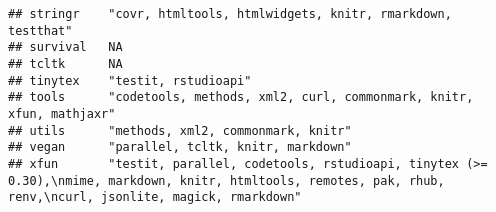 \documentclass[
]{article}
\begin{document}
\begin{verbatim}
## stringr    "covr, htmltools, htmlwidgets, knitr, rmarkdown, testthat"                                                                                                                                                                                                                                                                                         
## survival   NA                                                                                                                                                                                                                                                                                                                                                 
## tcltk      NA                                                                                                                                                                                                                                                                                                                                                 
## tinytex    "testit, rstudioapi"                                                                                                                                                                                                                                                                                                                               
## tools      "codetools, methods, xml2, curl, commonmark, knitr, xfun, mathjaxr"                                                                                                                                                                                                                                                                                
## utils      "methods, xml2, commonmark, knitr"                                                                                                                                                                                                                                                                                                                 
## vegan      "parallel, tcltk, knitr, markdown"                                                                                                                                                                                                                                                                                                                 
## xfun       "testit, parallel, codetools, rstudioapi, tinytex (>= 0.30),\nmime, markdown, knitr, htmltools, remotes, pak, rhub, renv,\ncurl, jsonlite, magick, rmarkdown"                                                                                                                                                                                      

\end{verbatim}
\end{document}

